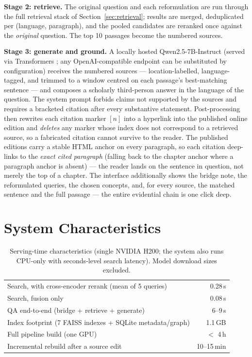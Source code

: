 \documentclass[pdflatex,sn-mathphys-num]{sn-jnl}
\begin{document}
\textbf{Stage 2: retrieve.} The original question and each reformulation
are run through the full retrieval stack of
Section~\ref{sec:retrieval}; results are merged, deduplicated per
(language, paragraph), and the pooled candidates are reranked once
against the \emph{original} question. The top 10 passages become the
numbered sources.

\textbf{Stage 3: generate and ground.} A locally hosted
Qwen2.5-7B-Instruct \cite{qwen25} (served via Transformers
\cite{wolf2020transformers}; any OpenAI-compatible endpoint can be
substituted by configuration) receives the numbered sources ---
location-labelled, language-tagged, and trimmed to a window centred on
each passage's best-matching sentence --- and composes a scholarly
third-person answer in the language of the question. The system prompt
forbids claims not supported by the sources and requires a bracketed
citation after every substantive statement. Post-processing then rewrites
each citation marker $[n]$ into a hyperlink into the published online
edition and \emph{deletes} any marker whose index does not correspond to a
retrieved source, so a fabricated citation cannot survive to the reader.
The published editions carry a stable HTML anchor on every paragraph, so
each citation deep-links to the \emph{exact cited paragraph} (falling back
to the chapter anchor where a paragraph anchor is absent) --- the reader
lands on the sentence in question, not merely the top of a chapter. The
interface additionally shows the bridge note,
the reformulated queries, the chosen concepts, and, for every source, the
matched sentence and the full passage --- the entire evidential chain is
one click deep.

\section{System Characteristics}
\label{sec:stats}

\begin{table}[t]
\centering
\caption{Serving-time characteristics (single NVIDIA H200; the system
also runs CPU-only with seconds-level search latency). Model download
sizes excluded.}
\label{tab:perf}
\begin{tabular}{lr}
\toprule
Search, with cross-encoder rerank (mean of 5 queries) & 0.28\,s\\
Search, fusion only & 0.08\,s\\
QA end-to-end (bridge + retrieve + generate) & 6--9\,s\\
Index footprint (7 FAISS indexes + SQLite metadata/graph) & 1.1\,GB\\
Full pipeline build (one GPU) & $<$ 4\,h\\
Incremental rebuild after a source edit & 10--15\,min\\
\bottomrule
\end{tabular}
\end{table}
\end{document}
